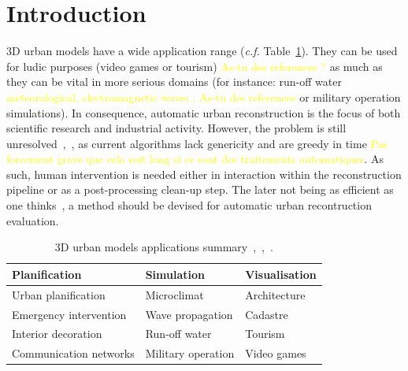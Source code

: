 \documentclass[runningheads]{llncs}
\begin{document}
\section{Introduction}
	3D urban models have a wide application range (\textit{c.f.} Table~\ref{tab::3d_applications}). They can be used for ludic purposes (video games or tourism) \textcolor{yellow}{As-tu des references ?} as much as they can be vital in more serious domains (for instance: run-off water \textcolor{yellow}{meteorological, electromagnetic waves : As-tu des references} or military operation simulations). In consequence, automatic urban reconstruction is the focus of both scientific research and industrial activity. However, the problem is still unresolved~\cite{Musialski2012},~\cite{rottensteiner2014results}, as current algorithms lack genericity and are greedy in time \textcolor{yellow}{Pas forcement grave que cela soit long si ce sont des traitements automatiques}. As such, human intervention is needed either in interaction within the reconstruction pipeline or as a post-processing clean-up step. The later not being as efficient as one thinks~\cite{Musialski2012}, a method should be devised for automatic urban recontruction evaluation.
	\begin{table}[H]
		\begin{center}
			\begin{tabular}{l l l}
				\toprule
				Planification & Simulation & Visualisation \\
				\midrule
				Urban planification & Microclimat & Architecture \\
				Emergency intervention & Wave propagation & Cadastre \\
				Interior decoration & Run-off water & Tourism \\
				Communication networks & Military operation & Video games \\
				\bottomrule
			\end{tabular}
			\caption{\label{tab::3d_applications} 3D urban models applications summary~\cite{Biljecki2015},~\cite{Scholze2002},~\cite{Wate2015}.}
		\end{center}
	\end{table}
\end{document}
